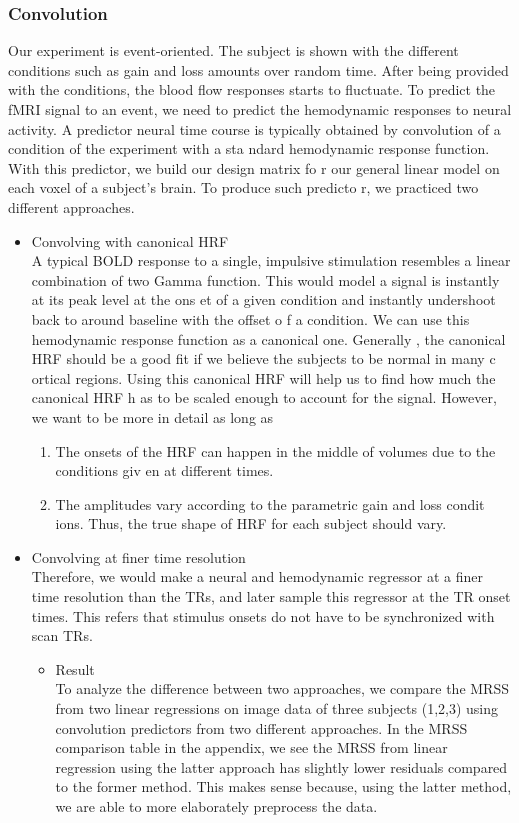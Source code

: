 \subsubsection {Convolution}
Our experiment is event-oriented. The subject is shown with the different conditions 
such as gain and loss amounts over random time. After being provided with the conditions,
 the blood flow responses starts to fluctuate. To predict the fMRI signal to an event, we
  need to predict the hemodynamic responses to neural activity. A predictor neural time 
  course is typically obtained by convolution of a condition of the experiment with a sta
  ndard hemodynamic response function. With this predictor, we build our design matrix fo
  r our general linear model on each voxel of a subject's brain. To produce such predicto
  r, we practiced two different approaches.
\begin{itemize}
\item  Convolving with canonical HRF \\
A typical BOLD response to a single, impulsive stimulation resembles a linear combination 
of two Gamma function. This would model a signal is instantly at its peak level at the ons
et of a given condition and instantly undershoot back to around baseline with the offset o
f a condition. We can use this hemodynamic response function as a canonical one. Generally
, the canonical HRF should be a good fit if we believe the subjects to be normal in many c
ortical regions. Using this canonical HRF will help us to find how much the canonical HRF h
as to be scaled enough to account for the signal. However, we want to be more in detail as 
long as 
\begin{enumerate}
  \item The onsets of the HRF can happen in the middle of volumes due to the conditions giv
en at different times. 
  \item The amplitudes vary according to the parametric gain and loss condit
ions. Thus, the true shape of HRF for each subject should vary.
\end{enumerate}

\item  Convolving at finer time resolution \\
Therefore, we would make a neural and hemodynamic regressor at a finer time resolution than
 the TRs, and later sample this regressor at the TR onset times. This refers that stimulus
  onsets do not have to be synchronized with scan TRs.

\begin{itemize} 
\item Result \\
To analyze the difference between two approaches, we compare the MRSS from two linear 
regressions on image data of three subjects (1,2,3) using convolution predictors from 
two different approaches. In the MRSS comparison table in the appendix, we see the MRSS from linear regression using the latter approach has slightly lower residuals compared to the former method. This 
makes sense because, using the latter method, we are able to more elaborately preprocess 
the data.
\end{itemize}
\end{itemize}


